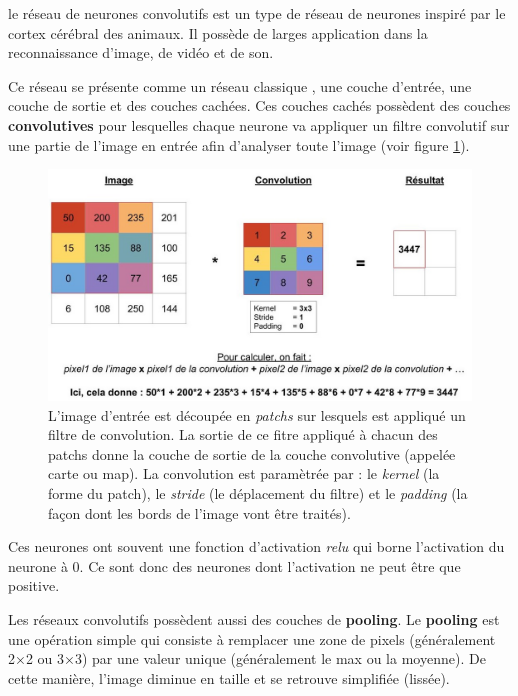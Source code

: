 le réseau de neurones convolutifs est un type de réseau de neurones
inspiré par le cortex cérébral des animaux.
Il possède de larges application dans la reconnaissance d'image, de vidéo et de son.

Ce réseau se présente comme un réseau classique , une couche d'entrée,
une couche de sortie et des couches cachées.
Ces couches cachés possèdent des couches \textbf{convolutives}
pour lesquelles chaque neurone va appliquer un filtre convolutif
sur une partie de l'image en entrée afin d'analyser toute l'image
(voir figure \ref{fig:explication_convolution}).

\begin{figure}[h!]
\begin{center}
\centering
\includegraphics[width=15cm]{./images/explication_convolution.jpg}
\caption[Schéma de la convolution.]{L'image d'entrée est découpée en \textit{patchs}
sur lesquels est appliqué un filtre de convolution.
La sortie de ce fitre appliqué à chacun des patchs donne la couche de sortie
de la couche convolutive (appelée carte ou map).
La convolution est paramètrée par : le \textit{kernel} (la forme du patch),
le \textit{stride} (le déplacement du filtre) et le \textit{padding}
 (la façon dont les bords de l'image vont être traités).\label{fig:explication_convolution}}
\end{center}
\end{figure}

Ces neurones ont souvent une fonction d'activation \textit{relu}
qui borne l'activation du neurone à 0. Ce sont donc des neurones
dont l'activation ne peut être que positive.

Les réseaux convolutifs possèdent aussi des couches de \textbf{pooling}.
Le \textbf{pooling} est une opération simple qui consiste à remplacer une zone de pixels
(généralement 2×2 ou 3×3) par une valeur unique (généralement le max ou la moyenne).
De cette manière, l’image diminue en taille et se retrouve simplifiée (lissée).

